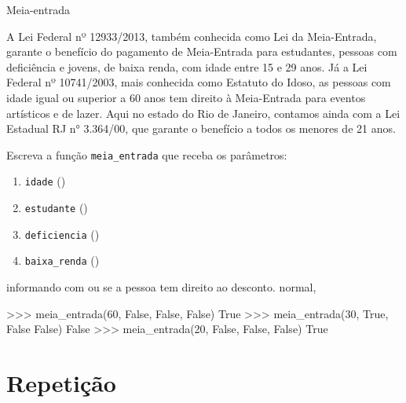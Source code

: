 	\begin{problem}{Meia-entrada}%

	A Lei Federal nº 12933/2013, também conhecida como Lei da Meia-Entrada, garante o benefício do pagamento de Meia-Entrada para estudantes, pessoas com deficiência e jovens, de baixa renda, com idade entre 15 e 29 anos. Já a Lei Federal nº 10741/2003, mais conhecida como Estatuto do Idoso, as pessoas com idade igual ou superior a 60 anos tem direito à Meia-Entrada para eventos artísticos e de lazer. Aqui no estado do Rio de Janeiro, contamos ainda com a Lei Estadual RJ n° 3.364/00, que garante o benefício a todos os menores de 21 anos. \par
	
	\proposal Escreva a função \texttt{meia\_entrada} que receba os parâmetros:
	\begin{enumerate} 
		\item \texttt{idade} ()
		\item \texttt{estudante} ()
		\item \texttt{deficiencia} ()
		\item \texttt{baixa\_renda} ()
	\end{enumerate}
	informando com  ou  se a pessoa tem direito ao desconto. normal,
    
	\begin{lstpython}
    >>> meia_entrada(60, False, False, False)
    True
    >>> meia_entrada(30, True, False False)
    False
    >>> meia_entrada(20, False, False, False)
    True
	\end{lstpython}
	\end{problem}


	\section*{Repetição}%

